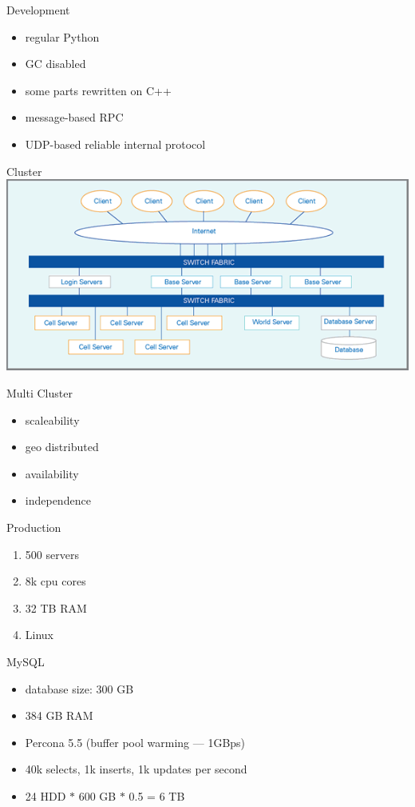 \documentclass[aspectratio=169]{beamer}
\begin{document}
\begin{frame}{Development}
    \begin{itemize}
        \item regular Python
        \item GC disabled
        \item some parts rewritten on C++
        \item message-based RPC
        \item UDP-based reliable internal protocol
    \end{itemize}
\end{frame}

{
\logo{}
\begin{frame}{Cluster}
\includegraphics[width=\textwidth]{server.png}
\end{frame}
}

\begin{frame}{Multi Cluster}
    \begin{itemize}
        \item scaleability
        \item geo distributed
        \item availability
        \item independence
    \end{itemize}
\end{frame}

\begin{frame}{Production}
    \begin{enumerate}
        \item 500 servers
        \item 8k cpu cores
        \item 32 TB RAM 
        \item Linux
    \end{enumerate}
\end{frame}

\begin{frame}{MySQL}
    \begin{itemize}
        \item database size: 300 GB
        \item 384 GB RAM
        \item Percona 5.5 (buffer pool warming --- 1GBps)
        \item 40k selects, 1k inserts, 1k updates per second
        \item 24 HDD $*$ 600 GB $*$ 0.5 = 6 TB
    \end{itemize}
\end{frame}
\end{document}
